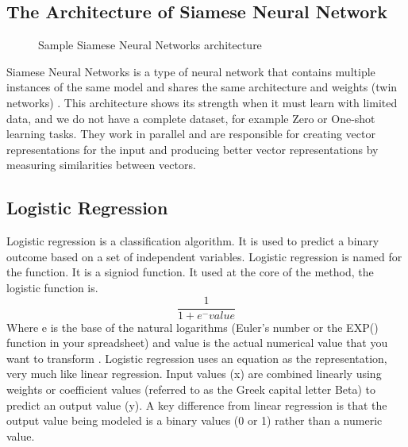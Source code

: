 \documentclass[12pt,oneside,openright,a4paper]{cpe-english-project}
\begin{document}
\subsection{The Architecture of Siamese Neural Network}
\begin{figure}[!h]
  \centering
  \setlength{\fboxrule}{0.2mm}
  \setlength{\fboxsep}{0.5cm}
  \caption{Sample Siamese Neural Networks architecture}
  \label{fig:siamese_arch}
\end{figure}
Siamese Neural Networks is a type of neural network that contains multiple instances of the
same model and shares the same architecture and weights (twin networks) \cite{what_is_embedding_matrix, how_to_predict_questions_pair_using_malstm, introduction_siamese_network}
. This architecture shows its strength when it must learn with limited data, and we do not have a complete dataset,
for example Zero or One-shot learning tasks. They work in parallel and are responsible for creating vector
representations for the input and producing better vector representations by measuring similarities between vectors.

\subsection{Logistic Regression}
Logistic regression is a classification algorithm. It is used to predict a binary outcome based on a set of independent variables. Logistic regression is named for the function. It is a signiod function. It used at the core of the method, the logistic function is.
\[\frac{1}{1 + e^-value}\]
Where e is the base of the natural logarithms (Euler’s number or the EXP() function in your spreadsheet) and value is the actual numerical value that you want to transform \cite{lg}.
Logistic regression uses an equation as the representation, very much like linear regression. Input values (x) are combined linearly using weights or coefficient values (referred to as the Greek capital letter Beta) to predict an output value (y). A key difference from linear regression is that the output value being modeled is a binary values (0 or 1) rather than a numeric value.
\end{document}
